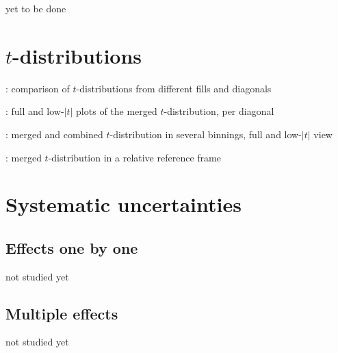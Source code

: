 \> yet to be done


\section{$t$-distributions}

\>  : comparison of $t$-distributions from different fills and diagonals

\>  : full and low-$|t|$ plots of the merged $t$-distribution, per diagonal

\>  : merged and combined $t$-distribution in several binnings, full and low-$|t|$ view

\>  : merged $t$-distribution in a relative reference frame


\section{Systematic uncertainties}

\subsection{Effects one by one}

\> not studied yet

\subsection{Multiple effects}

\> not studied yet



\bye
